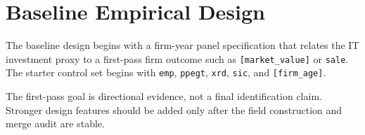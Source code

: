 \section{Baseline Empirical Design}

The baseline design begins with a firm-year panel specification that relates the IT investment proxy to a first-pass firm outcome such as \texttt{[market\_value]} or \texttt{sale}. The starter control set begins with \texttt{emp}, \texttt{ppegt}, \texttt{xrd}, \texttt{sic}, and \texttt{[firm\_age]}.

The first-pass goal is directional evidence, not a final identification claim. Stronger design features should be added only after the field construction and merge audit are stable.
